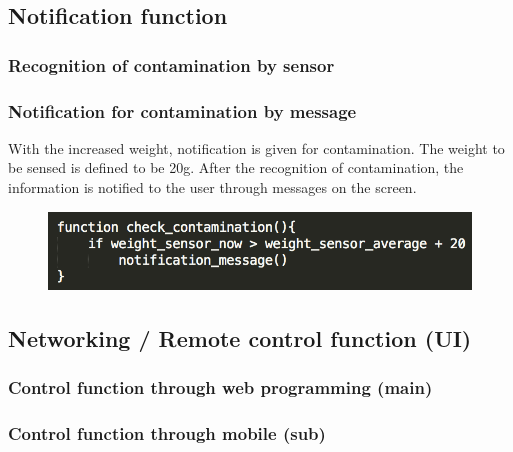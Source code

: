 \documentclass[conference]{IEEEtran}
\begin{document}
\subsection{Notification function}
\subsubsection{Recognition of contamination by sensor}
\subsubsection{Notification for contamination by message}
With the increased weight, notification is given for contamination. The weight to be sensed is defined to be 20g.
After the recognition of contamination, the information is notified to the user through messages on the screen.
\begin{figure}[htbp]
\begin{center}
    \includegraphics[scale=0.6]{notification1}
    \label{fig:label}
\end{center}
\end{figure}

\subsection{Networking / Remote control function (UI)}
\subsubsection{Control function through web programming (main)}
\subsubsection{Control function through mobile (sub)}
\end{document}

